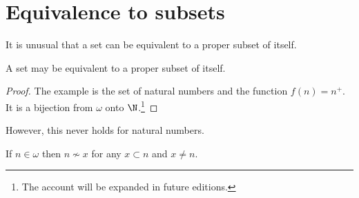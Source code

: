 \section*{Equivalence to subsets}

It is unusual that a set can be equivalent to a proper subset of itself.

\begin{proposition}
A set may be equivalent to a proper subset of itself.
\begin{proof}The example is the set of natural numbers and the function $f(n) = n^+$.
It is a bijection from $\omega $ onto $\N $.\footnote{The account will be expanded in future editions.}\end{proof}\end{proposition}
However, this never holds for natural numbers.
\begin{proposition}
If $n \in \omega $ then $n \not\sim x$ for any $x \subset n$ and $x \neq n$.\end{proposition}